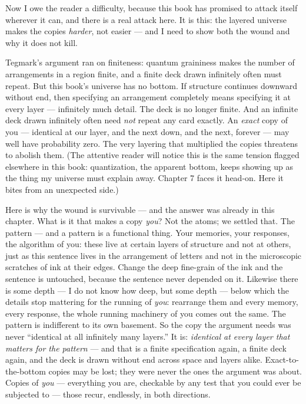\documentclass[fontsize=11pt,paper=a4,pagesize=auto,parskip=half-]{scrbook}
\begin{document}
Now I owe the reader a difficulty, because this book has promised to attack itself wherever it can, and there is a real attack here. It is this: the layered universe makes the copies \emph{harder}, not easier --- and I need to show both the wound and why it does not kill.

Tegmark's argument ran on finiteness: quantum graininess makes the number of arrangements in a region finite, and a finite deck drawn infinitely often must repeat. But this book's universe has no bottom. If structure continues downward without end, then specifying an arrangement completely means specifying it at every layer --- infinitely much detail. The deck is no longer finite. And an infinite deck drawn infinitely often need \emph{not} repeat any card exactly. An \emph{exact} copy of you --- identical at our layer, and the next down, and the next, forever --- may well have probability zero. The very layering that multiplied the copies threatens to abolish them. (The attentive reader will notice this is the same tension flagged elsewhere in this book: quantization, the apparent bottom, keeps showing up as the thing my universe must explain away. Chapter 7 faces it head-on. Here it bites from an unexpected side.)

Here is why the wound is survivable --- and the answer was already in this chapter. What is it that makes a copy \emph{you}? Not the atoms; we settled that. The pattern --- and a pattern is a functional thing. Your memories, your responses, the algorithm of you: these live at certain layers of structure and not at others, just as this sentence lives in the arrangement of letters and not in the microscopic scratches of ink at their edges. Change the deep fine-grain of the ink and the sentence is untouched, because the sentence never depended on it. Likewise there is some depth --- I do not know how deep, but some depth --- below which the details stop mattering for the running of \emph{you}: rearrange them and every memory, every response, the whole running machinery of you comes out the same. The pattern is indifferent to its own basement. So the copy the argument needs was never ``identical at all infinitely many layers.'' It is: \emph{identical at every layer that matters for the pattern} --- and that is a finite specification again, a finite deck again, and the deck is drawn without end across space and layers alike. Exact-to-the-bottom copies may be lost; they were never the ones the argument was about. Copies of \emph{you} --- everything you are, checkable by any test that you could ever be subjected to --- those recur, endlessly, in both directions.
\end{document}
